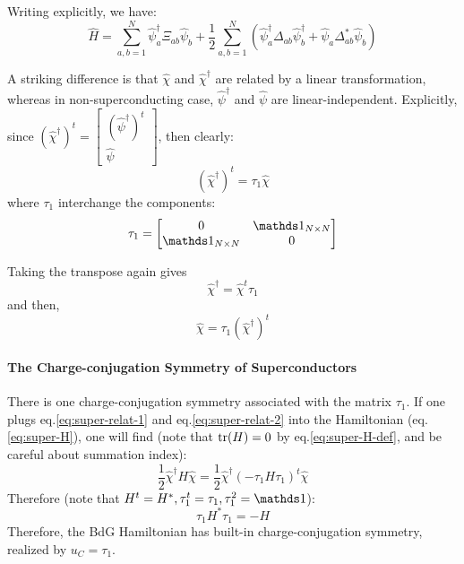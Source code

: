 \documentclass{article}
\begin{document}
Writing explicitly, we have:
\begin{equation}
    \hat{H} = \sum_{a,b=1}^N \hat\psi^\dagger_a \Xi_{ab} \hat\psi_b
    + \frac{1}{2} \sum_{a,b=1}^N \left(
        \hat\psi^\dagger_a \Delta_{ab} \hat\psi^\dagger_b
        + \hat\psi_a \Delta^*_{ab} \hat\psi_b
    \right)
\end{equation}

A striking difference is that $\hat\chi$ and $\hat\chi^\dagger$ are
related by a linear transformation, whereas in non-superconducting
case, $\hat\psi^\dagger$ and $\hat\psi$ are linear-independent.
Explicitly, since $\left(\hat\chi^\dagger \right)^t=
\begin{bmatrix}
    \left(\hat\psi^\dagger\right)^t \\ \hat\psi
\end{bmatrix}$, then clearly:
\begin{equation}
    \left(\hat\chi^\dagger \right)^t = \tau_1 \hat\chi
\end{equation}
where $\tau_1$ interchange the components:
\begin{equation}
    \tau_1 = \begin{bmatrix}
        0               & \id_{N\times N} \\
        \id_{N\times N} & 0
    \end{bmatrix}
\end{equation}

Taking the transpose again gives
\begin{equation}
    \label{eq:super-relat-1}
    \hat\chi^\dagger = \hat\chi^t \tau_1
\end{equation}
and then,
\begin{equation}
    \label{eq:super-relat-2}
    \hat\chi = \tau_1 (\hat\chi^\dagger)^t
\end{equation}
\paragraph{The Charge-conjugation Symmetry of Superconductors} There
is one charge-conjugation symmetry associated with the matrix
$\tau_1$. If one plugs eq.\ref{eq:super-relat-1} and
eq.\ref{eq:super-relat-2} into the Hamiltonian (eq.\ref{eq:super-H}),
one will find (note that $\tr(H)=0$ by eq.\ref{eq:super-H-def}, and be
careful about summation index):
\begin{equation}
    \frac{1}{2} \hat\chi^\dagger H \hat\chi
    = \frac{1}{2} \hat\chi^\dagger (-\tau_1 H \tau_1)^t \hat\chi
\end{equation}
Therefore (note that $H^t=H^*,\tau_1^t=\tau_1,\tau_1^2=\id$):
\begin{equation}
    \tau_1 H^* \tau_1 = -H
\end{equation}
Therefore, the BdG Hamiltonian has built-in charge-conjugation
symmetry, realized by $u_C = \tau_1$.
\end{document}
